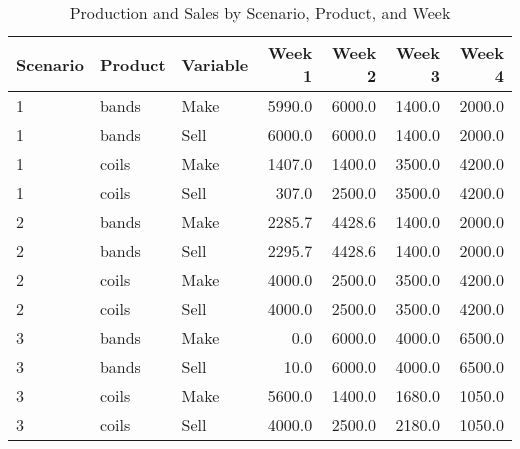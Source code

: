 \begin{table}[h!]
\centering
\caption{Production and Sales by Scenario, Product, and Week}
    \begin{tabular}{|lllrrrr|}
        \hline
        Scenario & Product & Variable & Week 1 & Week 2 & Week 3 & Week 4 \\
        \hline
        1 & bands & Make & 5990.0 & 6000.0 & 1400.0 & 2000.0 \\
        1 & bands & Sell & 6000.0 & 6000.0 & 1400.0 & 2000.0 \\
        1 & coils & Make & 1407.0 & 1400.0 & 3500.0 & 4200.0 \\
        1 & coils & Sell & 307.0 & 2500.0 & 3500.0 & 4200.0 \\
        \hline
        2 & bands & Make & 2285.7 & 4428.6 & 1400.0 & 2000.0 \\
        2 & bands & Sell & 2295.7 & 4428.6 & 1400.0 & 2000.0 \\
        2 & coils & Make & 4000.0 & 2500.0 & 3500.0 & 4200.0 \\
        2 & coils & Sell & 4000.0 & 2500.0 & 3500.0 & 4200.0 \\
        \hline
        3 & bands & Make & 0.0 & 6000.0 & 4000.0 & 6500.0 \\
        3 & bands & Sell & 10.0 & 6000.0 & 4000.0 & 6500.0 \\
        3 & coils & Make & 5600.0 & 1400.0 & 1680.0 & 1050.0 \\
        3 & coils & Sell & 4000.0 & 2500.0 & 2180.0 & 1050.0 \\
        \hline
    \end{tabular}
\end{table}
